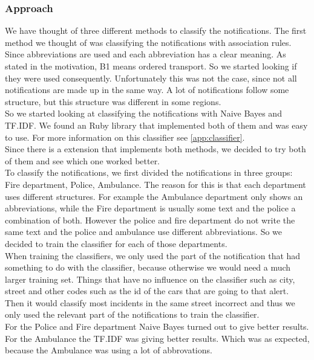 \subsubsection*{Approach}
We have thought of three different methods to classify the notifications.
The first method we thought of was classifying the notifications with association rules.
Since abbreviations are used and each abbreviation has a clear meaning. 
As stated in the motivation, B1 means ordered transport. 
So we started looking if they were used consequently. 
Unfortunately this was not the case, since not all notifications are made up in the same way. 
A lot of notifications follow some structure, but this structure was different in some regions. \\
So we  started looking at classifying the notifications with Naive Bayes and TF.IDF. 
We found an Ruby library that implemented both of them and was easy to use. 
For more information on this classifier see \autoref{app:classifier}. \\
Since there is a extension that implements both methods, we decided to try both of them and see which one worked better.\\
To classify the notifications, we first divided the notifications in three groups: Fire department, Police, Ambulance.
The reason for this is that each department uses different structures. For example the Ambulance department only shows an abbreviations, while the Fire department is usually some text and the police a combination of both. 
However the police and fire department do not write the same text and the police and ambulance use different abbreviations. So we decided to train the classifier for each of those departments. \\
When training the classifiers, we only used the part of the notification that had something to do with the classifier, because otherwise we would need a much larger training set. 
Things that have no influence on the classifier such as city, street and other codes such as the id of the cars that are going to that alert. Then it would classify most incidents in the same street incorrect and thus we only used the relevant part of the notifications to train the classifier. \\
For the Police and Fire department Naive Bayes turned out to give better results. For the Ambulance the TF.IDF was giving better results. Which was as  expected, because the Ambulance was using a lot of abbrovations. 

